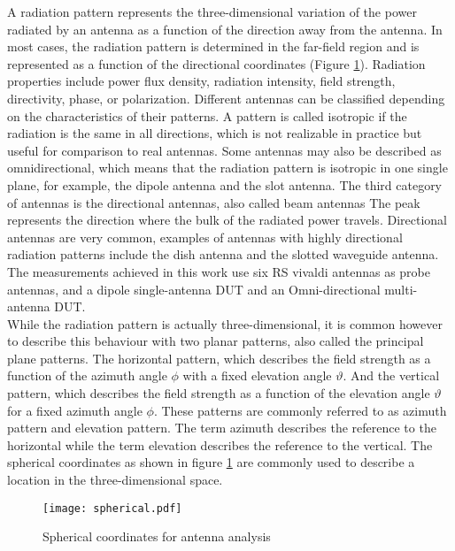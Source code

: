 A radiation pattern represents the three-dimensional variation of the power radiated by an antenna as a function of the direction away from the antenna. In most cases, the radiation pattern is determined in the far-field region and is represented as a function of the directional coordinates (Figure \ref{spherical}). Radiation properties include power flux density, radiation intensity, field strength, directivity, phase, or polarization. Different antennas can be classified depending on the characteristics of their patterns. A pattern is called isotropic if the radiation is the same in all directions, which is not realizable in practice but useful for comparison to real antennas. Some antennas may also be described as omnidirectional, which means that the radiation pattern is isotropic in one single plane, for example, the dipole antenna and the slot antenna. The third category of antennas is the directional antennas, also called beam antennas The peak represents the direction where the bulk of the radiated power travels. Directional antennas are very common, examples of antennas with highly directional radiation patterns include the dish antenna and the slotted waveguide antenna. The measurements achieved in this work use six \acs{RS}\textregistered{} vivaldi antennas as probe antennas, and a dipole single-antenna \acs{DUT} and an Omni-directional multi-antenna \acs{DUT}. \\

While the radiation pattern is actually three-dimensional, it is common however to describe this behaviour with two planar patterns, also called the principal plane patterns. The horizontal pattern, which describes the field strength as a function of the azimuth angle $\phi$  with a fixed elevation angle $ \vartheta$. And the vertical pattern, which describes the field strength as a function of the elevation angle $\vartheta$  for a fixed azimuth angle $\phi$. These patterns are commonly referred to as azimuth pattern and elevation pattern. The term azimuth describes the reference to the horizontal while the term elevation describes the reference to the vertical. The spherical coordinates as shown in figure \ref{spherical} are commonly used to describe a location in the three-dimensional space.

\begin{figure}[H]
	\begin{center}
	\vspace{-1cm}
		\texttt{[image: spherical.pdf]}
			\vspace{-1cm} 	\caption{\label{spherical}Spherical coordinates for antenna analysis \cite{balanis}}
	\end{center}
\end{figure}

